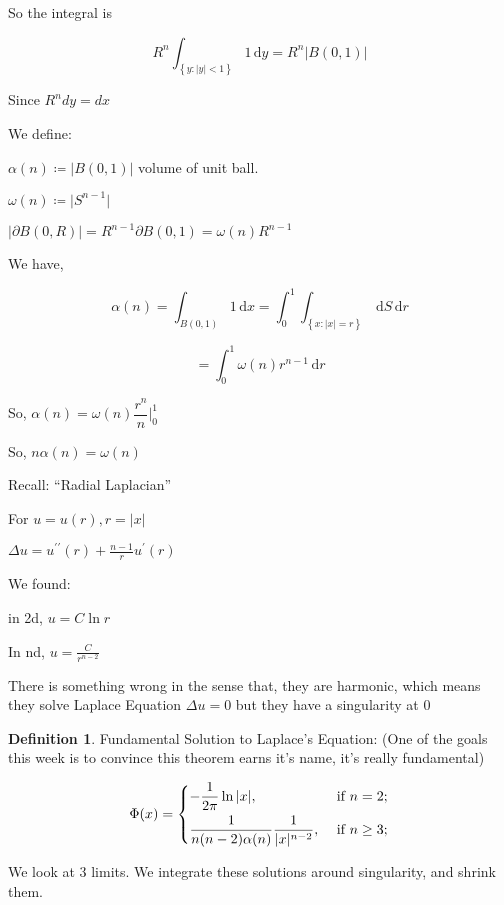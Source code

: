 \documentclass{article}
\theoremstyle{definition}
\newtheorem{definition}{Definition}
\begin{document}
So the integral is

\[
    R^n \int_{\left\{ y:\vert y \vert <1 \right\} }^{} 1 \,\mathrm{d}y = R^n \vert B(0,1) \vert  
\]

Since \(R^n dy=dx \)

We define:

\(\alpha(n)\coloneqq \vert B(0,1) \vert \) volume of unit ball.

\(\omega (n)\coloneqq \vert S^{n-1}  \vert \) 

\(\vert \partial B(0,R) \vert =R^{n-1} \partial B(0,1)=\omega (n)R^{n-1} \) 

We have,

\[
    \alpha (n)=\int_{B(0,1)}^{} 1 \,\mathrm{d}x =\int_{0}^{1} \int_{\left\{ x:\vert x \vert =r \right\} }^{}  \,\mathrm{d}S  \,\mathrm{d}r 
\]

\[
    =\int_{0}^{1} \omega (n) r^{n-1}  \,\mathrm{d}r 
\]

So, \(\alpha (n)=\omega (n)\dfrac{r^n}{n}\bigg\vert^1_0\) 

So, \(n \alpha (n)=\omega (n)\) 

Recall: ``Radial Laplacian''

For \(u=u(r), r=|x|\) 

\(\Delta u=u^{\prime\prime} (r)+\frac{n-1}{r}u^{\prime} (r)\) 

We found:

in 2d, \(u=C\ln r\)

In nd, \(u=\frac{C}{r^{n-2} }\) 

There is something wrong in the sense that, they are harmonic, which means they solve Laplace Equation \(\Delta u=0\) but they have a singularity at \(0\)

\begin{definition}
    Fundamental Solution to Laplace's Equation: (One of the goals this week is to convince this theorem earns it's name, it's really fundamental)

    \[
        \Phi(x) = \begin{dcases}
            -\frac{1}{2\pi}\ln \vert x \vert , &\text{ if } n=2 ;\\
            \frac{1}{n(n-2)\alpha (n)}\frac{1}{\vert x \vert ^{n-2}}, &\text{ if } n\geq 3 ;
        \end{dcases}
    \]

\end{definition}

We look at \(3\) limits. We integrate these solutions around singularity, and shrink them.
\end{document}
